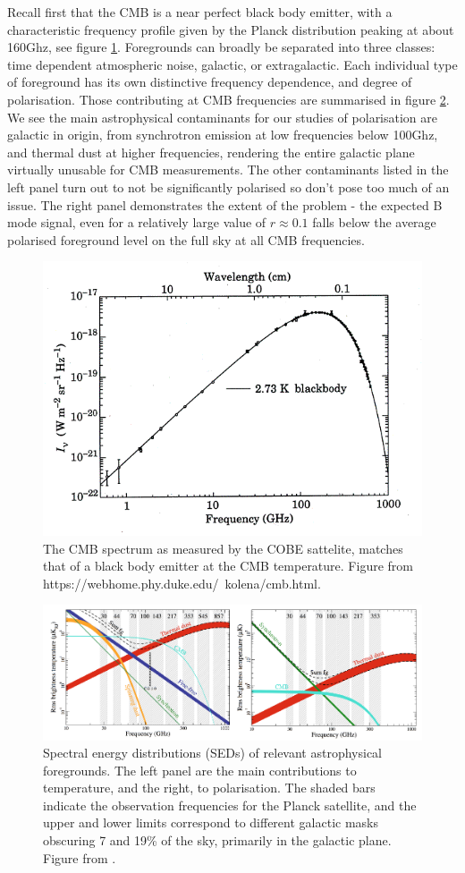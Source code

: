 \documentclass[a4paper,10pt]{article}
\begin{document}
Recall first that the CMB is a near perfect black body emitter, with a characteristic frequency profile given by the Planck distribution peaking at about 160Ghz, see figure \ref{cmbspec}. Foregrounds can broadly be separated into three classes: time dependent atmospheric noise, galactic, or extragalactic. Each individual type of foreground has its own distinctive frequency dependence, and degree of polarisation. Those contributing at CMB frequencies are summarised in figure \ref{foregrounds}. We see the main astrophysical contaminants for our studies of polarisation are galactic in origin, from synchrotron emission at low frequencies below 100Ghz, and thermal dust at higher frequencies, rendering the entire galactic plane virtually unusable for CMB measurements. The other contaminants listed in the left panel turn out to not be significantly polarised so don't pose too much of an issue. The right panel demonstrates the extent of the problem - the expected B mode signal, even for a relatively large value of $r\approx0.1$ falls below the average polarised foreground level on the full sky at all CMB frequencies.\\

\begin{figure}[h]
  \includegraphics[width=0.4\linewidth]{cmbspectrum1.png}
  \centering
  \caption{The CMB spectrum as measured by the COBE sattelite, matches that of a black body emitter at the CMB temperature. Figure from https://webhome.phy.duke.edu/~kolena/cmb.html.}
  \label{cmbspec}
\end{figure}

\begin{figure}[h]
\includegraphics[width=0.9\linewidth]{foregrounds.png}
\centering
\caption{Spectral energy distributions (SEDs) of relevant astrophysical foregrounds. The left panel are the main contributions to temperature, and the right, to polarisation. The shaded bars indicate the observation frequencies for the Planck satellite, and the upper and lower limits correspond to different galactic masks obscuring 7 and 19\% of the sky, primarily in the galactic plane. Figure from \cite{Planck2016b}.}
\label{foregrounds}
\end{figure}
\end{document}
